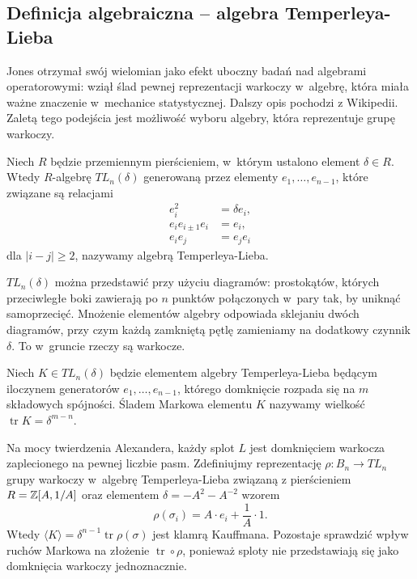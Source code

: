 \subsection{Definicja algebraiczna -- algebra Temperleya-Lieba} %
\label{sub:jones_paper}
Jones otrzymał swój wielomian jako efekt uboczny badań nad algebrami operatorowymi: wziął ślad pewnej reprezentacji warkoczy w~algebrę, która miała ważne znaczenie w~mechanice statystycznej.
Dalszy opis pochodzi z Wikipedii.
Zaletą tego podejścia jest możliwość wyboru algebry, która reprezentuje grupę warkoczy.

\begin{definition}
    Niech $R$ będzie przemiennym pierścieniem, w~którym ustalono element $\delta \in R$.
    Wtedy $R$-algebrę $TL_n(\delta)$ generowaną przez elementy $e_1, \ldots, e_{n-1}$, które związane są relacjami
    \begin{align}
        e_i^2 & = \delta e_i, \\
        e_i e_{i \pm 1} e_i & = e_i, \\
        e_i e_j & = e_j e_i
    \end{align}
    dla $|i-j| \ge 2$, nazywamy algebrą Temperleya-Lieba.
\end{definition}

$TL_n(\delta)$ można przedstawić przy użyciu diagramów: prostokątów, których przeciwległe boki zawierają po $n$ punktów połączonych w~pary tak, by uniknąć samoprzecięć. Mnożenie elementów algebry odpowiada sklejaniu dwóch diagramów, przy czym każdą zamkniętą pętlę zamieniamy na dodatkowy czynnik $\delta$.
To w~gruncie rzeczy są warkocze.

\begin{definition}
    Niech $K \in TL_n(\delta)$ będzie elementem algebry Temperleya-Lieba będącym iloczynem generatorów $e_1, \ldots, e_{n-1}$, którego domknięcie rozpada się na $m$ składowych spójności.
    Śladem Markowa elementu $K$ nazywamy wielkość $\operatorname{tr} K = \delta^{m-n}$.
\end{definition}

Na mocy twierdzenia Alexandera, każdy splot $L$ jest domknięciem warkocza zaplecionego na pewnej liczbie pasm.
Zdefiniujmy reprezentację $\rho \colon B_n \to TL_n$ grupy warkoczy w~algebrę Temperleya-Lieba związaną z pierścieniem $R = \mathbb Z[A, 1/A]$ oraz elementem $\delta = -A^2 - A^{-2}$ wzorem
\begin{equation}
    \rho(\sigma_i) = A \cdot e_i + \frac{1}{A} \cdot 1.
\end{equation}
Wtedy $\langle K \rangle = \delta^{n-1} \operatorname{tr} \rho (\sigma)$ jest klamrą Kauffmana.
Pozostaje sprawdzić wpływ ruchów Markowa na złożenie $\operatorname{tr} \circ \rho$, ponieważ sploty nie przedstawiają się jako domknięcia warkoczy jednoznacznie.

